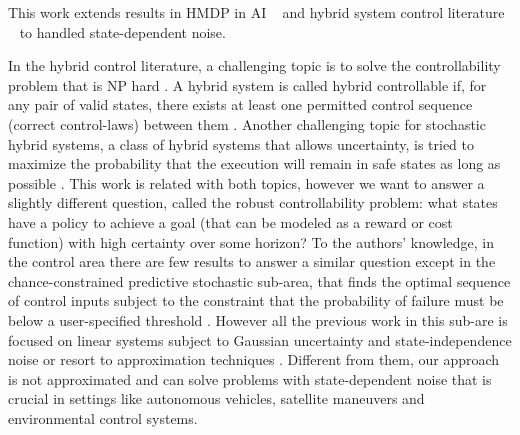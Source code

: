 

This work extends results in HMDP in AI ~\cite{boyan01,feng04,li05,kveton06,phase07,hao09,sdp_aaai} and hybrid system control literature 
~\cite{Henzinger:1997,Hu:2000,DeSHee:2009} to handled state-dependent noise.

In the hybrid control literature, a challenging topic is to solve the controllability problem that is NP
hard \cite{Blondel:1999}. A hybrid system is called hybrid controllable if, for any pair of valid
states, there exists at least one permitted control sequence (correct
control-laws) between them \cite{Tittus:1998,Yang:2007}.  Another challenging topic for stochastic hybrid systems, a class of hybrid systems that allows uncertainty, is tried to maximize the probability that the execution will remain in safe states as long as possible \cite{Hu:2000}.
This work is related with both topics, however we want to answer a slightly different question, called the robust controllability problem: what states have a policy to achieve a goal (that can be modeled as a reward or cost function) with high certainty over some horizon?
To the authors’ knowledge, in the control area there are few results to answer a similar question except in the
chance-constrained predictive stochastic sub-area, that finds the
optimal sequence of control inputs subject to the constraint that the
probability of failure must be below a user-specified
threshold \cite{Blackmore:2011}. However all the previous work in this sub-are
is focused on linear systems subject to
Gaussian uncertainty and state-independence noise \cite{Schwarm:1999,Li:2002,Ono:2008,Blackmore:2011} or resort to approximation techniques \cite{Blackmore:2010}. Different from them, our approach is not approximated and can solve problems with state-dependent noise that is crucial in settings like autonomous vehicles, satellite maneuvers and environmental control systems.

 
 




